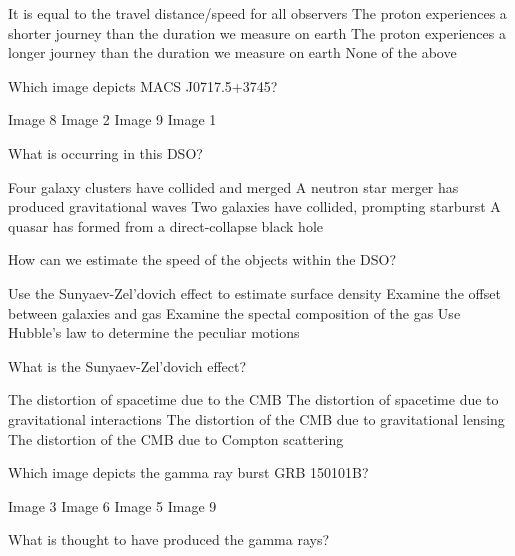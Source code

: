 \documentclass{exam}
\begin{document}
\begin{multicols*}{2}
\begin{questions}
	\begin{choices}
	\choice It is equal to the travel distance/speed for all observers
	\CorrectChoice The proton experiences a shorter journey than the duration we measure on earth 
	\choice The proton experiences a longer journey than the duration we measure on earth
	\choice None of the above
	\end{choices}
\end{questions}
\hrulefill
\begin{questions}
\setcounter{question}{24}
\question Which image depicts MACS J0717.5+3745?
	\begin{choices}
	\choice Image 8
	\choice Image 2
	\choice Image 9
	\CorrectChoice Image 1
	\end{choices}
\end{questions}
\vfill\null\columnbreak
\begin{questions}
\setcounter{question}{25}
\question What is occurring in this DSO?
	\begin{choices}
	\CorrectChoice Four galaxy clusters have collided and merged
	\choice A neutron star merger has produced gravitational waves
	\choice Two galaxies have collided, prompting starburst
	\choice A quasar has formed from a direct-collapse black hole
	\end{choices}
\question How can we estimate the speed of the objects within the DSO?
	\begin{choices}
	\choice Use the Sunyaev-Zel'dovich effect to estimate surface density
	\CorrectChoice Examine the offset between galaxies and gas
	\choice Examine the spectal composition of the gas
	\choice Use Hubble's law to determine the peculiar motions
	\end{choices}
\question What is the Sunyaev-Zel'dovich effect?
	\begin{choices}
	\choice The distortion of spacetime due to the CMB
	\choice The distortion of spacetime due to gravitational interactions
	\choice The distortion of the CMB due to gravitational lensing
	\CorrectChoice The distortion of the CMB due to Compton scattering
	\end{choices}
\end{questions}
\hrulefill
\begin{questions}
\setcounter{question}{28}
\question Which image depicts the gamma ray burst GRB 150101B?
	\begin{choices}
	\choice Image 3
	\choice Image 6
	\choice Image 5
	\CorrectChoice Image 9
	\end{choices}
\question What is thought to have produced the gamma rays?

\end{questions}
\end{multicols*}
\end{document}
